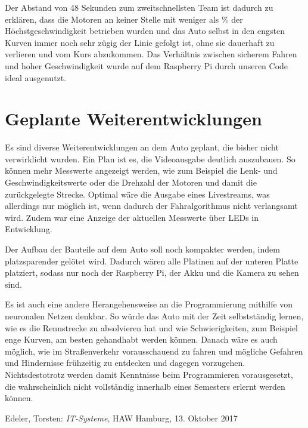 \documentclass[a4paper, 12pt]{scrartcl}
\begin{document}
Der Abstand von 48 Sekunden zum zweitschnellsten Team ist dadurch zu erklären, dass die Motoren an keiner Stelle mit weniger als \unit[40]{\%} der Höchstgeschwindigkeit betrieben wurden und das Auto selbst in den engsten Kurven immer noch sehr zügig der Linie gefolgt ist, ohne sie dauerhaft zu verlieren und vom Kurs abzukommen. Das Verhältnis zwischen sicherem Fahren und hoher Geschwindigkeit wurde auf dem Raspberry Pi durch unseren Code ideal ausgenutzt.


\section{Geplante Weiterentwicklungen}

Es sind diverse Weiterentwicklungen an dem Auto geplant, die bisher nicht verwirklicht wurden.
Ein Plan ist es, die Videoausgabe deutlich auszubauen. So können mehr Messwerte angezeigt werden, wie zum Beispiel die Lenk- und Geschwindigkeitswerte oder die Drehzahl der Motoren und damit die zurückgelegte Strecke. Optimal wäre die Ausgabe eines Livestreams, was allerdings nur möglich ist, wenn dadurch der Fahralgorithmus nicht verlangsamt wird.
Zudem war eine Anzeige der aktuellen Messwerte über LEDs in Entwicklung.

Der Aufbau der Bauteile auf dem Auto soll noch kompakter werden, indem platzsparender gelötet wird. Dadurch wären alle Platinen auf der unteren Platte platziert, sodass nur noch der Raspberry Pi, der Akku und die Kamera zu sehen sind.

Es ist auch eine andere Herangehensweise an die Programmierung mithilfe von neuronalen Netzen denkbar. So würde das Auto mit der Zeit selbstständig lernen, wie es die Rennstrecke zu absolvieren hat und wie Schwierigkeiten, zum Beispiel enge Kurven, am besten gehandhabt werden können. Danach wäre es auch möglich, wie im Straßenverkehr vorausschauend zu fahren und mögliche Gefahren und Hindernisse frühzeitig zu entdecken und dagegen vorzugehen. Nichtsdestotrotz werden damit Kenntnisse beim Programmieren vorausgesetzt, die wahrscheinlich nicht vollständig innerhalb eines Semesters erlernt werden können.

\newpage

\listoftables
{} 

\listoffigures
{} 


\begin{thebibliography}{}
	\bibitem{}
	Edeler, Torsten: \textit{IT-Systeme}, HAW Hamburg, 13. Oktober 2017
\end{thebibliography}
\end{document}
